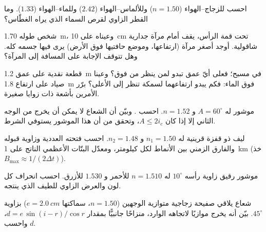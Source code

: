 \begin{exercise}[$\star$]\label{exo:b1:rays-reflection-refraction:3}
احسب  للزجاج--الهواء ($n = 1.50$) وللألماس--الهواء
($2.42$) وللماء--الهواء ($1.33$). وما القطر الزاوي
لقرص السماء الذي يراه الغطّاس؟
\end{exercise}

\begin{exercise}[$\star$]\label{exo:b1:rays-reflection-refraction:4}
شخص طوله \qty{1.70}{m}، وعيناه على \qty{10}{cm} تحت قمة
الرأس، يقف أمام مرآة جدارية شاقولية. أوجد أصغر مرآة
(ارتفاعها، وموضع حافتيها فوق الأرض) يرى فيها جسمه كله. وهل تتوقف
الإجابة على المسافة إلى المرآة؟
\end{exercise}

\begin{exercise}[$\star\star$]\label{exo:b1:rays-reflection-refraction:5}
قطعة نقدية على عمق \qty{1.2}{m} في مسبح؛ فعلى أيّ عمق تبدو
لمن ينظر من فوق؟ وعينا صياد على ارتفاع \qty{1.8}{m}
فوق الماء: فكم يبدو ارتفاعهما لسمكة تنظر إلى الأعلى؟ برّر
الأمرين بأشعة ذات زوايا صغيرة.
\end{exercise}

\begin{exercise}[$\star\star$]\label{exo:b1:rays-reflection-refraction:6}
موشور له $A = 60^\circ$ و $n = 1.52$. احسب . وبيّن أن الشعاع لا يمكن أن يخرج من الوجه الثاني إلا إذا كان
$A \leq 2 i_c$، وتحقق من أن هذا الموشور يستوفي الشرط.
\end{exercise}

\begin{exercise}[$\star\star$]\label{exo:b1:rays-reflection-refraction:7}
ليف ذو قفزة قرينية له $n_1 = 1.50$ و $n_2 = 1.48$. احسب
فتحته العددية وزاوية قبوله والفارق الزمني بين الأنماط لكل
كيلومتر، ومعدّل البتّات الأعظمي الناتج على \qty{1}{km}
(خذ $B_{\max} \approx 1/(2\Delta t)$).
\end{exercise}

\begin{exercise}[$\star\star$]\label{exo:b1:rays-reflection-refraction:8}
موشور رقيق زاوية رأسه $10^\circ$ له $n = 1.510$ للأحمر و $1.530$
للأزرق. احسب انحراف كل لون والعرض الزاوي
للطيف الذي ينتجه.
\end{exercise}

\begin{exercise}[$\star\star$]\label{exo:b1:rays-reflection-refraction:9}
شعاع يلاقي صفيحة زجاجية متوازية الوجهين ($n = 1.50$، سماكتها
$e = \qty{2.0}{cm}$) بزاوية $45^\circ$. بيّن أنه يخرج موازيًا
لاتجاهه الوارد، منزاحًا جانبيًّا بمقدار $d = e\,\sin(i - r)/\cos r$،
واحسب $d$.
\end{exercise}

